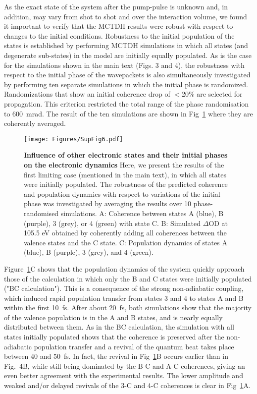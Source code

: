 \documentclass[12pt]{article}
\begin{document}
As the exact state of the system after the pump-pulse is unknown and, in addition, may vary from shot to shot and over the interaction volume, we found it important to verify that the MCTDH results were robust with respect to changes to the initial conditions. Robustness to the initial population of the states is established by performing MCTDH simulations in which all states (and degenerate sub-states) in the model are initially equally populated. As is the case for the simulations shown in the main text (Figs. 3 and 4), the robustness with respect to the initial phase of the wavepackets is also simultaneously investigated by performing ten separate simulations in which the initial phase is randomized. Randomizations that show an initial coherence drop of $<$20\% are selected for propagation. This criterion restricted the total range of the phase randomisation to 600~mrad. The result of the ten simulations are shown in Fig~\ref{robustness} where they are coherently averaged.

\begin{figure}[h!]
\texttt{[image: Figures/SupFig6.pdf]}
\caption{\label{robustness}\textbf{Influence of other electronic states and their initial phases on the electronic dynamics} Here, we present the results of the first limiting case (mentioned in the main text), in which all states were initially populated. The robustness of the predicted coherence and population dynamics with respect to variations of the initial phase was investigated by averaging the results over 10 phase-randomised simulations. A: Coherence between states A (blue), B (purple), 3 (grey), or 4 (green) with state C. B: Simulated $\Delta$OD at 105.5 eV obtained by coherently adding all coherences between the valence states and the C state. C: Population dynamics of states A (blue), B (purple), 3 (grey), and 4 (green).}
\end{figure}

Figure~\ref{robustness}C shows that the population dynamics of the system quickly approach those of the calculation in which only the B and C states were initially populated ("BC calculation"). This is a consequence of the strong non-adiabatic coupling, which induced rapid population transfer from states 3 and 4 to states A and B within the first 10~fs. After about 20~fs, both simulations show that the majority of the valence population is in the A and B states, and is nearly equally distributed between them. As in the BC calculation, the simulation with all states initially populated shows that the coherence is preserved after the non-adiabatic population transfer and a revival of the quantum beat takes place between 40 and 50~fs. In fact, the revival in Fig~\ref{robustness}B occurs earlier than in Fig.~4B, while still being dominated by the B-C and A-C coherences, giving an even better agreement with the experimental results. The lower amplitude and weaked and/or delayed revivals of the 3-C and 4-C coherences is clear in Fig~\ref{robustness}A. 
\end{document}
